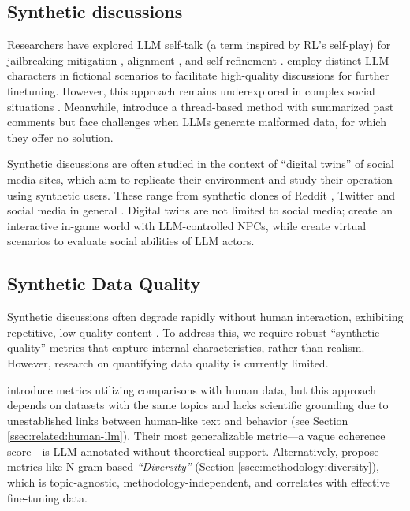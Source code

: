 \subsection{Synthetic discussions}
\label{ssec:related:discussions}


Researchers have explored \ac{LLM} self-talk (a term inspired by \ac{RL}'s self-play\citep{cheng-self-play}) for jailbreaking mitigation \cite{liu2024largelanguagemodelsagents, cheng-self-play}, alignment \cite{Bai2022ConstitutionalAH, collective_constitution}, and self-refinement \cite{Madaan2023SelfRefineIR, lambert2024}. \citet{ulmer2024} employ distinct LLM characters in fictional scenarios to facilitate high-quality discussions for further finetuning. However, this approach remains underexplored in complex social situations \cite{zhou-etal-2024-real}. Meanwhile, \citet{balog_2024} introduce a thread-based method with summarized past comments but face challenges when \acp{LLM} generate malformed data, for which they offer no solution.

Synthetic discussions are often studied in the context of “digital twins” of social media sites, which aim to replicate their environment and study their operation using synthetic users. These range from synthetic clones of Reddit \cite{park_simulacra}, Twitter \cite{mou_2024} and social media in general \cite{tornberg_2023, y_social}. Digital twins are not limited to social media; \citet{Park2023GenerativeAI} create an interactive in-game world with \ac{LLM}-controlled \acp{NPC}, while \citet{zhou_2024_sotopia} create virtual scenarios to evaluate social abilities of \ac{LLM} actors.  


\subsection{Synthetic Data Quality}

Synthetic discussions often degrade rapidly without human interaction, exhibiting repetitive, low-quality content \citep{ulmer2024}. To address this, we require robust “synthetic quality” metrics that capture internal characteristics, rather than realism. However, research on quantifying data quality is currently limited.

\citet{balog_2024} introduce metrics utilizing comparisons with human data, but this approach depends on datasets with the same topics and lacks scientific grounding due to unestablished links between human-like text and behavior (see Section \ref{ssec:related:human-llm}). Their most generalizable metric—a vague coherence score—is \ac{LLM}-annotated without theoretical support. Alternatively, \citet{ulmer2024} propose metrics like N-gram-based \textit{“Diversity”} (Section \ref{ssec:methodology:diversity}), which is topic-agnostic, methodology-independent, and correlates with effective fine-tuning data.



